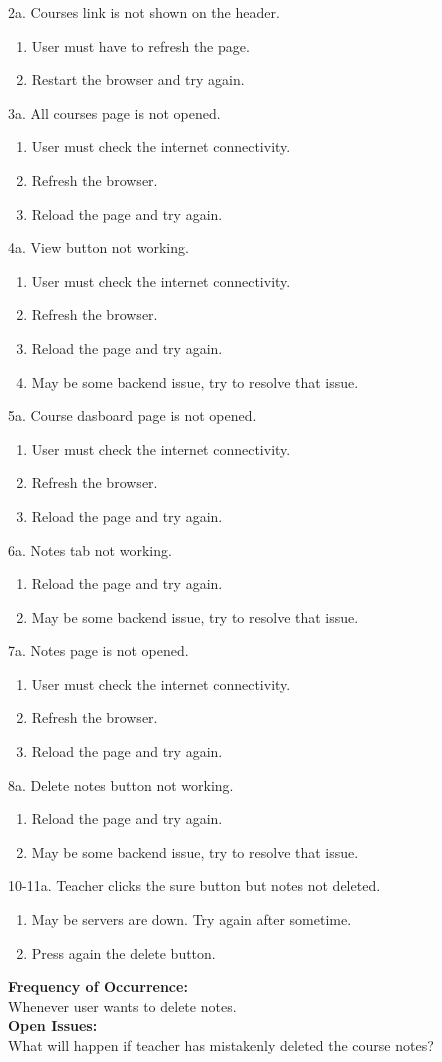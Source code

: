 \documentclass[12pt]{article}
\begin{document}
2a. Courses link is not shown on the header.
\begin{enumerate}
\item User must have to refresh the page.
\item Restart the browser and try again.
\end{enumerate} 
3a. All courses page is not opened.
\begin{enumerate}
\item User must check the internet connectivity.
\item Refresh the browser.
\item Reload the page and try again.
\end{enumerate}
4a. View button not working.
\begin{enumerate}
\item User must check the internet connectivity.
\item Refresh the browser.
\item Reload the page and try again.
\item May be some backend issue, try to resolve that issue.
\end{enumerate}
5a. Course dasboard page is not opened.
\begin{enumerate}
\item User must check the internet connectivity.
\item Refresh the browser.
\item Reload the page and try again.
\end{enumerate}
6a. Notes tab not working.
\begin{enumerate}
\item Reload the page and try again.
\item May be some backend issue, try to resolve that issue.
\end{enumerate}
7a. Notes page is not opened.
\begin{enumerate}
\item User must check the internet connectivity.
\item Refresh the browser.
\item Reload the page and try again.
\end{enumerate}
8a. Delete notes button not working.
\begin{enumerate}
\item Reload the page and try again.
\item May be some backend issue, try to resolve that issue.
\end{enumerate}
10-11a. Teacher clicks the sure button but notes not deleted.
\begin{enumerate}
\item May be servers are down. Try again after sometime.
\item Press again the delete button.
\end{enumerate}
\textbf{Frequency of Occurrence:}\\
Whenever user wants to delete notes.\\
\textbf{Open Issues:}\\
What will happen if teacher has mistakenly deleted the course notes?
\end{document}
